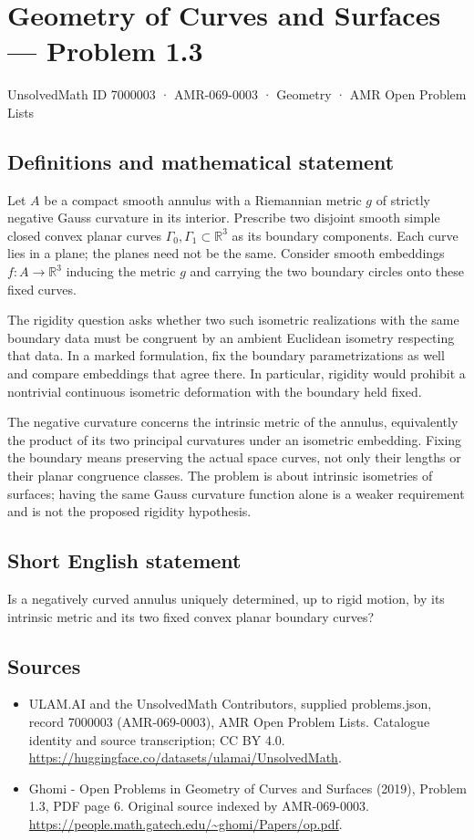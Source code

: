 \documentclass[11pt,a4paper]{article}
\begin{document}
\section*{Geometry of Curves and Surfaces — Problem 1.3}\label{7000003}
{\small UnsolvedMath ID 7000003 · AMR-069-0003 · Geometry · AMR Open Problem Lists}
\subsection{Definitions and mathematical statement}
Let $A$ be a compact smooth annulus with a Riemannian metric $g$
of strictly negative Gauss curvature in its interior. Prescribe
two disjoint smooth simple closed convex planar curves
$\Gamma_0,\Gamma_1\subset\mathbb R^3$ as its boundary components.
Each curve lies in a plane; the planes need not be the same.
Consider smooth embeddings $f:A\to\mathbb R^3$ inducing the metric
$g$ and carrying the two boundary circles onto these fixed curves.

The rigidity question asks whether two such isometric realizations
with the same boundary data must be congruent by an ambient
Euclidean isometry respecting that data. In a marked formulation,
fix the boundary parametrizations as well and compare embeddings
that agree there. In particular, rigidity would prohibit a
nontrivial continuous isometric deformation with the boundary
held fixed.

The negative curvature concerns the intrinsic metric of the
annulus, equivalently the product of its two principal curvatures
under an isometric embedding. Fixing the boundary means preserving
the actual space curves, not only their lengths or their planar
congruence classes. The problem is about intrinsic isometries of
surfaces; having the same Gauss curvature function alone is a
weaker requirement and is not the proposed rigidity hypothesis.
\subsection{Short English statement}
Is a negatively curved annulus uniquely determined, up to rigid
motion, by its intrinsic metric and its two fixed convex planar
boundary curves?
\subsection{Sources}
\begin{itemize}
\item[S1] ULAM.AI and the UnsolvedMath Contributors, supplied problems.json, record 7000003 (AMR-069-0003), AMR Open Problem Lists. Catalogue identity and source transcription; CC BY 4.0.
\url{https://huggingface.co/datasets/ulamai/UnsolvedMath}.
\item[S2] Ghomi - Open Problems in Geometry of Curves and Surfaces (2019), Problem 1.3, PDF page 6. Original source indexed by AMR-069-0003.
\url{https://people.math.gatech.edu/~ghomi/Papers/op.pdf}.
\end{itemize}
\end{document}
